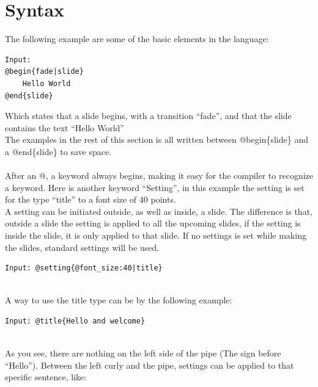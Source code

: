 \chapter{Syntax}
\label{SSyntax}
The following example are some of the basic elements in the language:
\begin{lstlisting}[frame=single]
Input:
@begin{fade|slide}
    Hello World
@end{slide}
\end{lstlisting}


Which states that a slide begins, with a transition ``fade'', and that the slide contains the text ``Hello World'' \\
The examples in the rest of this section is all written between @begin\{slide\} and a @end\{slide\} to save space.
\\ \\
After an @, a keyword always begins, making it easy for the compiler to recognize a keyword.
Here is another keyword ``Setting'', in this example the setting is set for the type ``title'' to a font size of 40 points. \\
A setting can be initiated outside, as well as inside, a slide. The difference is that, outside a slide the setting is applied to all the upcoming slides, if the setting is inside the slide, it is only applied to that slide. If no settings is set while making the slides, standard settings will be used.

\begin{lstlisting}[frame=single]
Input: @setting{@font_size:40|title}
\end{lstlisting}

 \\

A way to use the title type can be by the following example:\\

\begin{lstlisting}[frame=single]
Input: @title{Hello and welcome}
\end{lstlisting}

\\

As you see, there are nothing on the left side of the pipe (The sign before ``Hello''). Between the left curly and the pipe, settings can be applied to that specific sentence, like:\\


